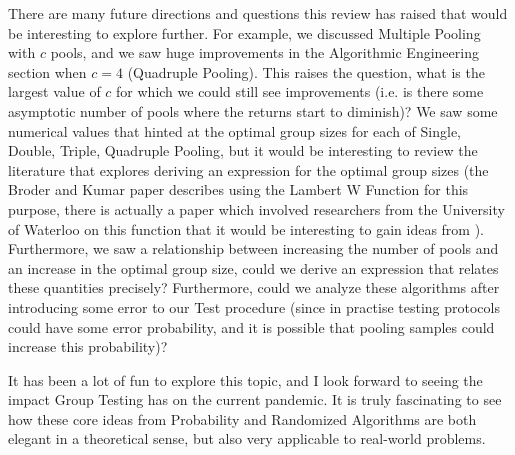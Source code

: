 \documentclass[12pt]{article}
\begin{document}
There are many future directions and questions this review has raised that would be interesting to explore further. For example, we discussed Multiple Pooling with $c$ pools, and we saw huge improvements in the Algorithmic Engineering section when $c=4$ (Quadruple Pooling). This raises the question, what is the largest value of $c$ for which we could still see improvements (i.e. is there some asymptotic number of pools where the returns start to diminish)? We saw some numerical values that hinted at the optimal group sizes for each of Single, Double, Triple, Quadruple Pooling, but it would be interesting to review the literature that explores deriving an expression for the optimal group sizes (the Broder and Kumar paper describes using the Lambert W Function for this purpose, there is actually a paper which involved researchers from the University of Waterloo on this function that it would be interesting to gain ideas from \cite{lambert}). Furthermore, we saw a relationship between increasing the number of pools and an increase in the optimal group size, could we derive an expression that relates these quantities precisely? Furthermore, could we analyze these algorithms after introducing some error to our {\sf Test} procedure (since in practise testing protocols could have some error probability, and it is possible that pooling samples could increase this probability)? 

It has been a lot of fun to explore this topic, and I look forward to seeing the impact Group Testing has on the current pandemic. It is truly fascinating to see how these core ideas from Probability and Randomized Algorithms are both elegant in a theoretical sense, but also very applicable to real-world problems.


\end{document}
